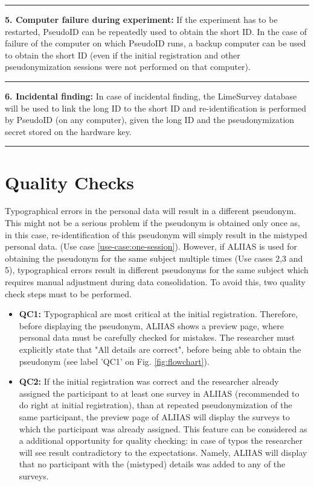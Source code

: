 \par\noindent\rule{\textwidth\color{pniblue}}{0.4pt}
\textbf{5. Computer failure during experiment:}
If the experiment has to be restarted, PseudoID can be repeatedly used to obtain the short ID. In the case of failure of the computer on which PseudoID runs, a backup computer can be used to obtain the short ID (even if the initial registration and other pseudonymization sessions were not performed on that computer).

\par\noindent\rule{\textwidth\color{pniblue}}{0.4pt}
\textbf{6. Incidental finding:} In case of incidental finding, the LimeSurvey database will be used to link the long ID to the short ID and re-identification is performed by PseudoID (on any computer), given the long ID and the pseudonymization secret stored on the hardware key. 

\par\noindent\rule{\textwidth\color{pniblue}}{0.4pt}
\section{Quality Checks}
Typographical errors in the personal data will result in a different pseudonym. This might not be a serious problem if the pseudonym is obtained only once as, in this case, re-identification of this pseudonym will simply result in the mistyped personal data. (Use case \ref{use-case:one-session}).
However, if ALIIAS is used for obtaining the pseudonym for the same subject multiple times (Use cases 2,3 and 5), typographical errors result in different pseudonyms for the same subject which requires manual adjustment during data consolidation.
To avoid this, two quality check steps must to be performed.
\begin{itemize}
    \item \textbf{QC1:} Typographical are most critical at the initial registration. Therefore, before displaying the pseudonym, ALIIAS shows a preview page, where personal data must be carefully checked for mistakes. The researcher must explicitly state that "All details are correct", before being able to obtain the pseudonym (see label 'QC1' on Fig. \ref{fig:flowchart}).
    \item \textbf{QC2:} If the initial registration was correct and the researcher already assigned the participant to at least one survey in ALIIAS (recommended to do right at initial registration), than at repeated pseudonymization of the same participant, the preview page of ALIIAS will display the surveys to which the participant was already assigned. This feature can be considered as a additional opportunity for quality checking: in case of typos the researcher will see result contradictory to the expectations. Namely, ALIIAS will display that no participant with the (mistyped) details was added to any of the surveys.
\end{itemize}